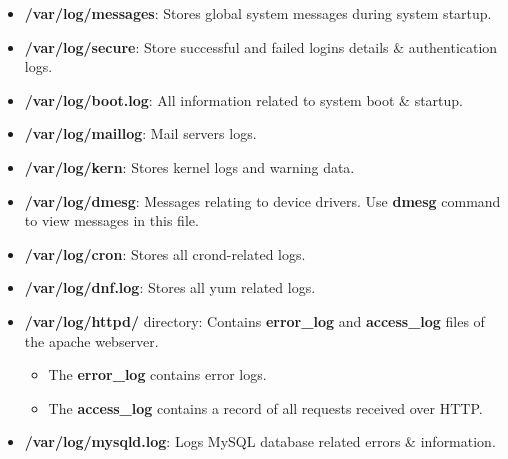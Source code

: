 \setlength{\columnsep}{3pt}
\begin{flushleft}
\bigskip
\bigskip

\begin{itemize}
	\item \textbf{/var/log/messages}: Stores global system messages during system startup.
	\bigskip
	\item \textbf{/var/log/secure}: Store successful and failed logins details \& authentication logs.
	\bigskip
	\item \textbf{/var/log/boot.log}: All information related to system boot \& startup.
	\bigskip
	\item \textbf{/var/log/maillog}: Mail servers logs.
	\bigskip
	\item \textbf{/var/log/kern}: Stores kernel logs and warning data.
	\bigskip
	\item \textbf{/var/log/dmesg}: Messages relating to device drivers. Use \textbf{dmesg} command to view messages in this file.
	\bigskip
	\item \textbf{/var/log/cron}: Stores all crond-related logs.
	\bigskip
	\item \textbf{/var/log/dnf.log}: Stores all yum related logs.
	\bigskip
	\item \textbf{/var/log/httpd/} directory: Contains \textbf{error\_log} and \textbf{access\_log} files of the apache webserver.

	\begin{itemize}
		\item The \textbf{error\_log} contains error logs.
		\item The \textbf{access\_log} contains a record of all requests received over HTTP.
	\end{itemize}
	\bigskip
	\item \textbf{/var/log/mysqld.log}: Logs MySQL database related errors \& information.
	
\end{itemize}



\end{flushleft}
\newpage


